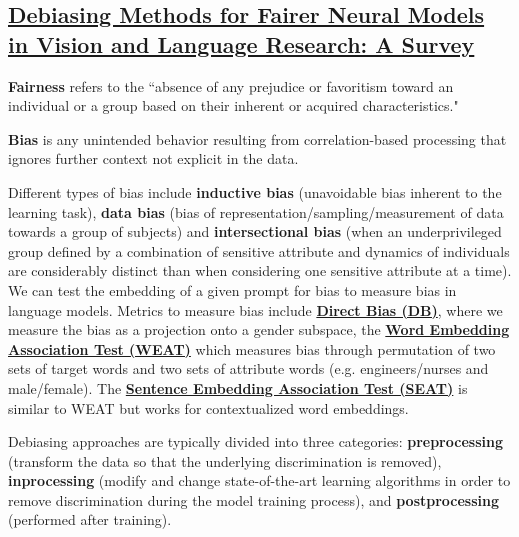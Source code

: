 \documentclass[12pt]{amsart}
\begin{document}
\subsection{\href{https://arxiv.org/pdf/2211.05617.pdf}{Debiasing Methods for Fairer Neural Models in Vision and Language Research: A Survey}}

\begin{definition}[Fairness]
\textbf{Fairness} refers to the ``absence of any prejudice or favoritism toward an individual or a group based on their inherent or acquired characteristics."
\end{definition}

\begin{definition}[Bias]
\textbf{Bias} is any unintended behavior resulting from correlation-based processing that ignores further context not explicit in the data.
\end{definition}

Different types of bias include \textbf{inductive bias} (unavoidable bias inherent to the learning task), \textbf{data bias} (bias of representation/sampling/measurement of data towards a group of subjects) and \textbf{intersectional bias} (when an underprivileged group defined by a combination of sensitive attribute and  dynamics of individuals are considerably distinct than when considering one sensitive attribute at a time). \\

We can test the embedding of a given prompt for bias to measure bias in language models. Metrics to measure bias include \href{https://arxiv.org/pdf/1607.06520.pdf}{\textbf{Direct Bias (DB)}}, where we measure the bias as a projection onto a gender subspace, the \href{https://purehost.bath.ac.uk/ws/portalfiles/portal/168480066/CaliskanEtAl_authors_full.pdf}{\textbf{Word Embedding Association Test (WEAT)}} which measures bias through permutation of two sets of target words and two sets of attribute words (e.g. engineers/nurses and male/female). The \href{https://arxiv.org/pdf/1903.10561.pdf}{\textbf{Sentence Embedding Association Test (SEAT)}} is similar to WEAT but works for contextualized word embeddings. \\

\begin{definition}
Debiasing approaches are typically divided into three categories: \textbf{preprocessing} (transform the data so that the underlying
discrimination is removed), \textbf{inprocessing} (modify and change state-of-the-art learning
algorithms in order to remove discrimination during the model training process), and \textbf{postprocessing} (performed after training).
\end{definition}
\end{document}
